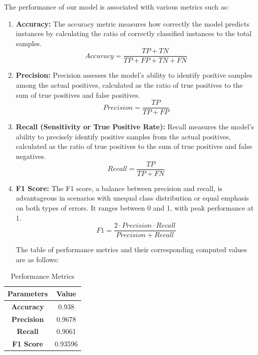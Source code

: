 The performance of our model is associated with various metrics such as:
\begin{enumerate}
    \item \textbf{Accuracy:}
          The accuracy metric measures how correctly the model predicts instances by calculating the ratio of correctly classified instances to the total samples.
          \begin{equation}
              Accuracy = \frac{TP + TN}{TP + FP + TN + FN}
          \end{equation}

    \item \textbf{Precision:}
          Precision assesses the model's ability to identify positive samples among the actual positives, calculated as the ratio of true positives to the sum of true positives and false positives.
          \begin{equation}
              Precision = \frac{TP}{TP + FP}
          \end{equation}

    \item \textbf{Recall (Sensitivity or True Positive Rate):}
          Recall measures the model's ability to precisely identify positive samples from the actual positives, calculated as the ratio of true positives to the sum of true positives and false negatives.
          \begin{equation}
              Recall = \frac{TP}{TP + FN}
          \end{equation}

    \item \textbf{F1 Score:}
          The F1 score, a balance between precision and recall, is advantageous in scenarios with unequal class distribution or equal emphasis on both types of errors. It ranges between 0 and 1, with peak performance at 1.
          \begin{equation}
              F1 = \frac{2 \cdot Precision \cdot Recall}{Precision + Recall}
          \end{equation}

          The table of performance metrics and their corresponding computed values are as follows:
\end{enumerate}


\begin{table}[h]
    \centering
    \renewcommand{\arraystretch}{1.5} %
    \begin{tabular}{|c|c|}
        \hline
        \textbf{Parameters} & \textbf{Value} \\
        \hline
        \textbf{Accuracy}   & 0.938          \\
        \hline
        \textbf{Precision}  & 0.9678         \\
        \hline
        \textbf{Recall}     & 0.9061         \\
        \hline
        \textbf{F1 Score}   & 0.93596        \\
        \hline
    \end{tabular}
    \caption{Performance Metrics}
    \label{tab:metrics}
\end{table}





